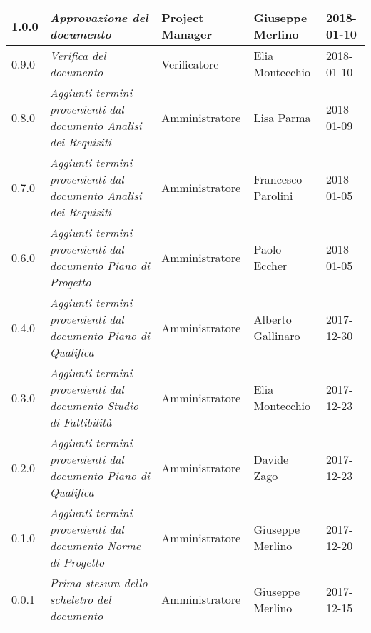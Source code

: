 \begin{longtable}{C{2cm}|C{4cm}|C{3cm}|C{3cm}|R{2cm}}
		1.0.0 & \emph{Approvazione del documento} & Project Manager & Giuseppe Merlino & 2018-01-10  \\
		\hline
		
		0.9.0 & \emph{Verifica del documento} & Verificatore & Elia Montecchio  & 2018-01-10 \\
		\hline
		
		0.8.0 & \emph{Aggiunti termini provenienti dal documento Analisi dei Requisiti} & Amministratore  & Lisa Parma & 2018-01-09 \\
		\hline
		
		0.7.0 & \emph{Aggiunti termini provenienti dal documento Analisi dei Requisiti} & Amministratore & Francesco Parolini & 2018-01-05 \\
		\hline
		
		0.6.0 & \emph{Aggiunti termini provenienti dal documento Piano di Progetto} & Amministratore & Paolo Eccher & 2018-01-05  \\
		\hline
		
		0.4.0 & \emph{Aggiunti termini provenienti dal documento Piano di Qualifica} & Amministratore & Alberto Gallinaro & 2017-12-30 \\
		\hline
		
		0.3.0 & \emph{Aggiunti termini provenienti dal documento Studio di Fattibilità} & Amministratore & Elia Montecchio & 2017-12-23 \\
		\hline
		
		0.2.0 & \emph{Aggiunti termini provenienti dal documento Piano di Qualifica}  & Amministratore & Davide Zago & 2017-12-23 \\
		\hline
		
		0.1.0 & \emph{Aggiunti termini provenienti dal documento Norme di Progetto}  & Amministratore & Giuseppe Merlino & 2017-12-20 \\
		\hline
		
		0.0.1 & \emph{Prima stesura dello scheletro del documento} & Amministratore  & Giuseppe Merlino & 2017-12-15   \\
		\hline
\end{longtable}


\clearpage